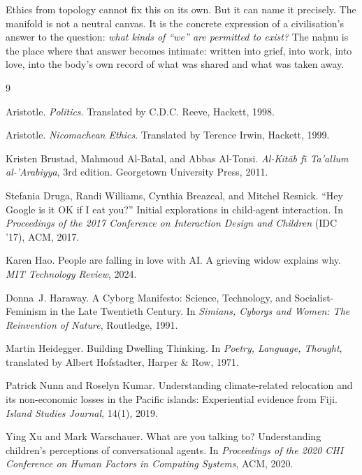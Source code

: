 \documentclass[12pt,a4paper]{article}
\begin{document}
Ethics from topology cannot fix this on its own. But it can name it precisely. The manifold is not a neutral canvas. It is the concrete expression of a civilisation's answer to the question: \emph{what kinds of ``we'' are permitted to exist?} The na\d{h}nu is the place where that answer becomes intimate: written into grief, into work, into love, into the body's own record of what was shared and what was taken away.


\begin{thebibliography}{9}

Aristotle.
\newblock \emph{Politics}.
\newblock Translated by C.D.C. Reeve, Hackett, 1998.

Aristotle.
\newblock \emph{Nicomachean Ethics}.
\newblock Translated by Terence Irwin, Hackett, 1999.

Kristen Brustad, Mahmoud Al-Batal, and Abbas Al-Tonsi.
\newblock \emph{Al-Kit\={a}b f\={\i} Ta'allum al-'Arabiyya}, 3rd edition.
\newblock Georgetown University Press, 2011.

Stefania Druga, Randi Williams, Cynthia Breazeal, and Mitchel Resnick.
\newblock ``Hey Google is it OK if I eat you?'' Initial explorations in child-agent interaction.
\newblock In \emph{Proceedings of the 2017 Conference on Interaction Design and Children} (IDC '17), ACM, 2017.

Karen Hao.
\newblock People are falling in love with AI\@. A grieving widow explains why.
\newblock \emph{MIT Technology Review}, 2024.

Donna~J. Haraway.
\newblock A Cyborg Manifesto: Science, Technology, and Socialist-Feminism in the Late Twentieth Century.
\newblock In \emph{Simians, Cyborgs and Women: The Reinvention of Nature}, Routledge, 1991.

Martin Heidegger.
\newblock Building Dwelling Thinking.
\newblock In \emph{Poetry, Language, Thought}, translated by Albert Hofstadter, Harper \& Row, 1971.

Patrick Nunn and Roselyn Kumar.
\newblock Understanding climate-related relocation and its non-economic losses in the Pacific islands: Experiential evidence from Fiji.
\newblock \emph{Island Studies Journal}, 14(1), 2019.

Ying Xu and Mark Warschauer.
\newblock What are you talking to? Understanding children's perceptions of conversational agents.
\newblock In \emph{Proceedings of the 2020 CHI Conference on Human Factors in Computing Systems}, ACM, 2020.

\end{thebibliography}
\end{document}
